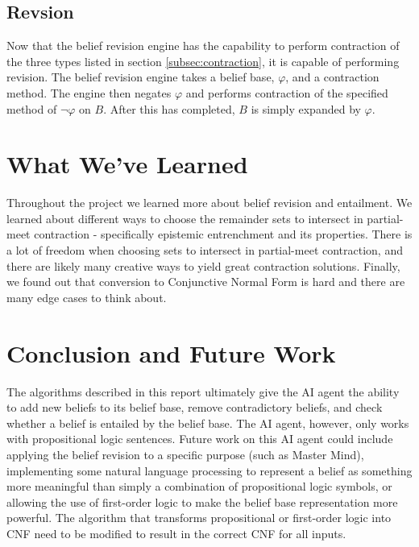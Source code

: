 \documentclass[a4paper,10pt]{article}
\begin{document}
\subsection{Revsion}
\label{subsec:revision}
Now that the belief revision engine has the capability to perform contraction of the three types listed in section \ref{subsec:contraction}, it is capable of performing revision. The belief revision engine takes a belief base, $\varphi$, and a contraction method. The engine then negates $\varphi$ and performs contraction of the specified method of $\neg\varphi$ on $B$. After this has completed, $B$ is simply expanded by $\varphi$.


\section{What We've Learned}
\label{sec:learned}
Throughout the project we learned more about belief revision and entailment. We learned about different ways to choose the remainder sets to intersect in partial-meet contraction - specifically epistemic entrenchment and its properties. There is a lot of freedom when choosing sets to intersect in partial-meet contraction, and there are likely many creative ways to yield great contraction solutions. Finally, we found out that conversion to Conjunctive Normal Form is hard and there are many edge cases to think about.

\section{Conclusion and Future Work}
\label{sec:conclusion}
The algorithms described in this report ultimately give the AI agent the ability to add new beliefs to its belief base, remove contradictory beliefs, and check whether a belief is entailed by the belief base. The AI agent, however, only works with propositional logic sentences. Future work on this AI agent could include applying the belief revision to a specific purpose (such as Master Mind), implementing some natural language processing to represent a belief as something more meaningful than simply a combination of propositional logic symbols, or allowing the use of first-order logic to make the belief base representation more powerful. The algorithm that transforms propositional or first-order logic into CNF need to be modified to result in the correct CNF for all inputs.


\end{document}
